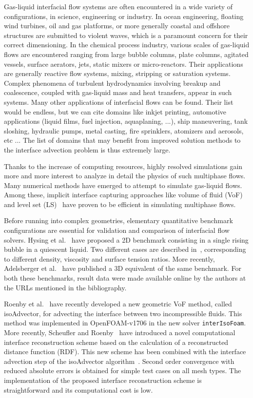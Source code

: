 \documentclass[review]{elsarticle}
\begin{document}
Gas-liquid interfacial flow systems are often encountered in a wide variety of configurations, in science, engineering or industry. In ocean engineering, floating wind turbines, oil and gas platforms, or more generally coastal and offshore structures are submitted to violent waves, which is a paramount concern for their correct dimensioning. In the chemical process industry, various scales of gas-liquid flows are encountered ranging from large bubble columns, plate columns, agitated vessels, surface aerators, jets, static mixers or micro-reactors. Their applications are generally reactive flow systems, mixing, stripping or saturation systems. Complex phenomena of turbulent hydrodynamics involving breakup and coalescence, coupled with gas-liquid mass and heat transfers, appear in such systems. Many other applications of interfacial flows can be found. Their list would be endless, but we can cite domains like inkjet printing, automotive applications (liquid films, fuel injection, aquaplaning, ...), ship maneuvering, tank sloshing, hydraulic pumps, metal casting, fire sprinklers, atomizers and aerosols, etc ... The list of domains that may benefit from improved solution methods to the interface advection problem is thus extremely large. 

Thanks to the increase of computing resources, highly resolved simulations gain more and more 
interest to analyze in detail the physics of such multiphase flows. Many numerical methods 
have emerged to attempt to simulate gas-liquid flows. Among these, implicit interface capturing 
approaches like volume of fluid (VoF)~\cite{HIRT1981201} and level set (LS)~\cite{OSHER198812} 
have proven to be efficient in simulating multiphase flows. 

Before running into complex geometries, elementary quantitative benchmark configurations are 
essential for validation and comparison of interfacial flow solvers. Hysing et 
al.~\cite{Hysing2009} have proposed a 2D benchmark consisting in a single rising bubble in 
a quiescent liquid. Two different cases are described in~\cite{Hysing2009}, corresponding to 
different density, viscosity and surface tension ratios. More recently, Adelsberger et al.~\cite{Adelsberger2014} have published a 3D equivalent of the same benchmark. For both these benchmarks, result data were made available online by the authors at the URLs mentioned in the bibliography. 

Roenby et al.~\cite{Roenby160405} have recently developed a new geometric VoF method, called isoAdvector, for advecting the interface between two incompressible fluids. This method was implemented in OpenFOAM-v1706 in the new solver \verb+interIsoFoam+. 
More recently, Scheufler and Roenby~\cite{Scheufler2018} have introduced a novel computational interface reconstruction scheme based on the calculation of a reconstructed distance function (RDF). This new scheme has been combined with the interface advection step of the isoAdvector algorithm~\cite{Scheufler2018}. Second order convergence with reduced absolute errors is obtained for simple test cases on all mesh types. The implementation of the proposed interface reconstruction scheme is straightforward and its computational cost is low. 
\end{document}
